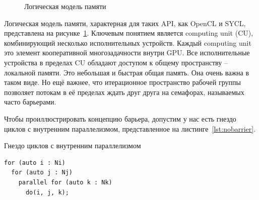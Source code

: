 \begin{figure}[ht]
    \caption{Логическая модель памяти}\label{fig:logical-memory}
\end{figure}

Логическая модель памяти, характерная для таких API, как OpenCL и SYCL, представлена на рисунке~\cref{fig:logical-memory}. Ключевым понятием является computing unit (CU), комбинирующий несколько исполнительных устройств. Каждый computing unit это элемент кооперативной многозадачности внутри GPU. Все исполнительные устройства в пределах CU обладают доступом к общему пространству -- локальной памяти. Это небольшая и быстрая общая память. Она очень важна в таком виде. Но ещё важнее, что итерационное пространство рабочей группы позволяет потокам в её пределах ждать друг друга на семафорах, называемых часто барьерами.

Чтобы проиллюстрировать концепцию барьера, допустим у нас есть гнездо циклов с внутренним параллелизмом, представленное на листинге~\cref{lst:nobarrier}.

\begin{ListingEnv}[!h]
    \captiondelim{ } 
    \caption{Гнездо циклов с внутренним параллелизмом}\label{lst:nobarrier}
    \begin{lstlisting}[language={[ISO]C++}]
for (auto i : Ni)
  for (auto j : Nj)
    parallel for (auto k : Nk)
      do(i, j, k);
    \end{lstlisting}
\end{ListingEnv}

